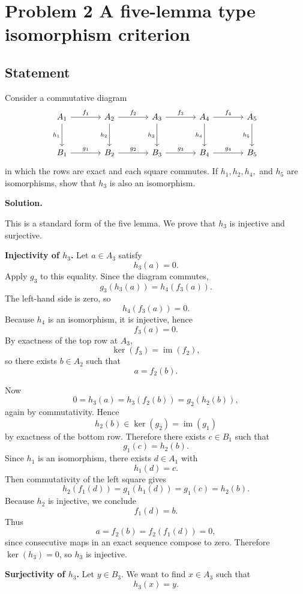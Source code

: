 \documentclass[12pt,a4paper]{article}
\theoremstyle{notespace}
\begin{document}
\section{Problem 2 A five-lemma type isomorphism criterion}

\subsection*{Statement}
Consider a commutative diagram
\[
\begin{tikzcd}[column sep=large, row sep=large]
	A_1 \arrow[r,"f_1"] \arrow[d,"h_1"'] &
	A_2 \arrow[r,"f_2"] \arrow[d,"h_2"'] &
	A_3 \arrow[r,"f_3"] \arrow[d,"h_3"'] &
	A_4 \arrow[r,"f_4"] \arrow[d,"h_4"'] &
	A_5 \arrow[d,"h_5"'] \\
	B_1 \arrow[r,"g_1"] &
	B_2 \arrow[r,"g_2"] &
	B_3 \arrow[r,"g_3"] &
	B_4 \arrow[r,"g_4"] &
	B_5
\end{tikzcd}
\]
in which the rows are exact and each square commutes. If \(h_1,h_2,h_4,\) and \(h_5\) are isomorphisms, show that \(h_3\) is also an isomorphism.

\textbf{Solution.}

This is a standard form of the five lemma. We prove that \(h_3\) is injective and surjective.

\medskip

\textbf{Injectivity of \(h_3\).}
Let \(a\in A_3\) satisfy
\[
h_3(a)=0.
\]
Apply \(g_3\) to this equality. Since the diagram commutes,
\[
g_3(h_3(a))=h_4(f_3(a)).
\]
The left-hand side is zero, so
\[
h_4(f_3(a))=0.
\]
Because \(h_4\) is an isomorphism, it is injective, hence
\[
f_3(a)=0.
\]
By exactness of the top row at \(A_3\),
\[
\ker(f_3)=\operatorname{im}(f_2),
\]
so there exists \(b\in A_2\) such that
\[
a=f_2(b).
\]

Now
\[
0=h_3(a)=h_3(f_2(b))=g_2(h_2(b)),
\]
again by commutativity. Hence
\[
h_2(b)\in \ker(g_2)=\operatorname{im}(g_1)
\]
by exactness of the bottom row. Therefore there exists \(c\in B_1\) such that
\[
g_1(c)=h_2(b).
\]
Since \(h_1\) is an isomorphism, there exists \(d\in A_1\) with
\[
h_1(d)=c.
\]
Then commutativity of the left square gives
\[
h_2(f_1(d))=g_1(h_1(d))=g_1(c)=h_2(b).
\]
Because \(h_2\) is injective, we conclude
\[
f_1(d)=b.
\]
Thus
\[
a=f_2(b)=f_2(f_1(d))=0,
\]
since consecutive maps in an exact sequence compose to zero. Therefore \(\ker(h_3)=0\), so \(h_3\) is injective.

\medskip

\textbf{Surjectivity of \(h_3\).}
Let \(y\in B_3\). We want to find \(x\in A_3\) such that
\[
h_3(x)=y.
\]
\end{document}
